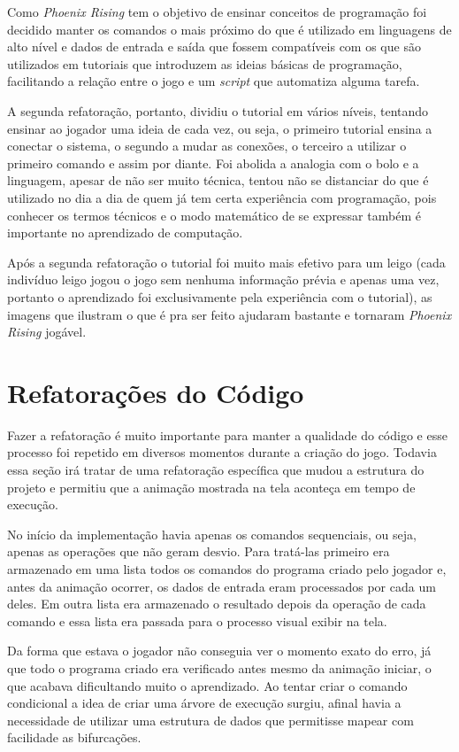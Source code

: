 Como \textit{Phoenix Rising} tem o objetivo de ensinar conceitos de programação 
foi decidido manter os comandos o mais próximo do que é utilizado em linguagens
de alto nível e dados de entrada e saída que fossem compatíveis com os que são 
utilizados em tutoriais que introduzem as ideias básicas de programação, 
facilitando a relação entre o jogo e um \textit{script} que automatiza alguma 
tarefa.

A segunda refatoração, portanto, dividiu o tutorial em vários níveis, tentando 
ensinar ao jogador uma ideia de cada vez, ou seja, o primeiro tutorial ensina 
a conectar o sistema, o segundo a mudar as conexões, o terceiro a utilizar o 
primeiro comando e assim por diante. Foi abolida a analogia com o bolo e a 
linguagem, apesar de não ser muito técnica, tentou não se distanciar do que é
utilizado no dia a dia de quem já tem certa experiência com programação, pois 
conhecer os termos técnicos e o modo matemático de se expressar também é 
importante no aprendizado de computação.

Após a segunda refatoração o tutorial foi muito mais efetivo para um leigo
(cada indivíduo leigo jogou o jogo sem nenhuma informação prévia e apenas uma 
vez, portanto o aprendizado foi exclusivamente pela experiência com o 
tutorial), as imagens que ilustram o que é pra ser feito ajudaram bastante
e tornaram \textit{Phoenix Rising} jogável.

\section{Refatorações do Código}

Fazer a refatoração é muito importante para manter a qualidade do código e esse 
processo foi repetido em diversos momentos durante a criação do jogo. Todavia 
essa seção irá tratar de uma refatoração específica que mudou a estrutura do 
projeto e permitiu que a animação mostrada na tela aconteça em tempo de 
execução.

No início da implementação havia apenas os comandos sequenciais, ou seja, 
apenas as operações que não geram desvio. Para tratá-las primeiro era armazenado 
em uma lista todos os comandos do programa criado pelo jogador e, antes da 
animação ocorrer, os dados de entrada eram processados por cada um deles. Em 
outra lista era armazenado o resultado depois da operação de cada comando e 
essa lista era passada para o processo visual exibir na tela.

Da forma que estava o jogador não conseguia ver o momento exato do erro, já que 
todo o programa criado era verificado antes mesmo da animação iniciar, o que
acabava dificultando muito o aprendizado. Ao tentar criar o comando condicional 
a idea de criar uma árvore de execução surgiu, afinal havia a necessidade de 
utilizar uma estrutura de dados que permitisse mapear com facilidade 
as bifurcações.

